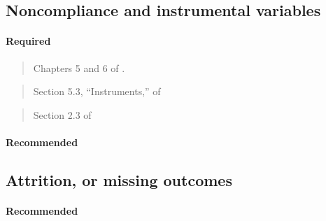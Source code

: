 \documentclass[12pt]{article}
\begin{document}
\subsection{Noncompliance and instrumental variables}

\paragraph*{Required}

\begin{verse} Chapters 5 and 6 of . \end{verse}

\begin{verse}  \end{verse}

\begin{verse}
 \end{verse}

\begin{verse}
  Section 5.3, ``Instruments,'' of  \end{verse}

\begin{verse} Section 2.3 of  \end{verse}

\paragraph*{Recommended}

\begin{verse}  \end{verse}

\begin{verse}  \end{verse}

\begin{verse}  \end{verse}

\subsection{Attrition, or missing outcomes}

\paragraph*{Recommended}
\end{document}

